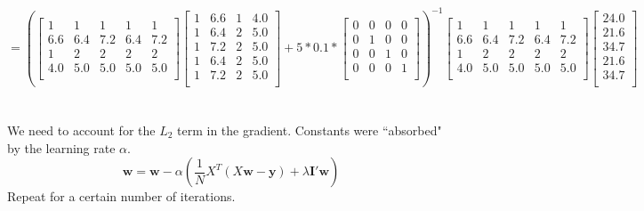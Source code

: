 \documentclass[12pt]{article}
\begin{document}
\[
= \left(
\begin{bmatrix}
	1 & 1 & 1 & 1 & 1 \\
	6.6 & 6.4 & 7.2 & 6.4 & 7.2 \\
	1 & 2 & 2 & 2 & 2 \\
	4.0 & 5.0 & 5.0 & 5.0 & 5.0 \\
\end{bmatrix}
\begin{bmatrix}
	1 & 6.6 & 1 & 4.0 \\
	1 & 6.4 & 2 & 5.0 \\
	1 & 7.2 & 2 & 5.0 \\
	1 & 6.4 & 2 & 5.0 \\
	1 & 7.2 & 2 & 5.0 \\
\end{bmatrix}+5 * 0.1 * 
\begin{bmatrix}
	0 & 0 & 0 & 0 \\
	0 & 1 & 0 & 0 \\
	0 & 0 & 1 & 0 \\
	0 & 0 & 0 & 1 \\
\end{bmatrix}\right)^{-1}
\begin{bmatrix}
	1 & 1 & 1 & 1 & 1 \\
	6.6 & 6.4 & 7.2 & 6.4 & 7.2 \\
	1 & 2 & 2 & 2 & 2 \\
	4.0 & 5.0 & 5.0 & 5.0 & 5.0 \\
\end{bmatrix}
\begin{bmatrix}
	24.0 \\
	21.6 \\
	34.7 \\
	21.6 \\
	34.7 \\
\end{bmatrix}
\]
\newpage

\section{}
We need to account for the $ L_2 $ term in the gradient. Constants were ``absorbed" by the learning rate $ \alpha $.
\[ \textbf{w} = \textbf{w} - \alpha\left(\dfrac{1}{N} X^T\left(X\textbf{w}-\textbf{y}\right) + \lambda \textbf{I}'\textbf{w} \right) \]
Repeat for a certain number of iterations.
\end{document}
